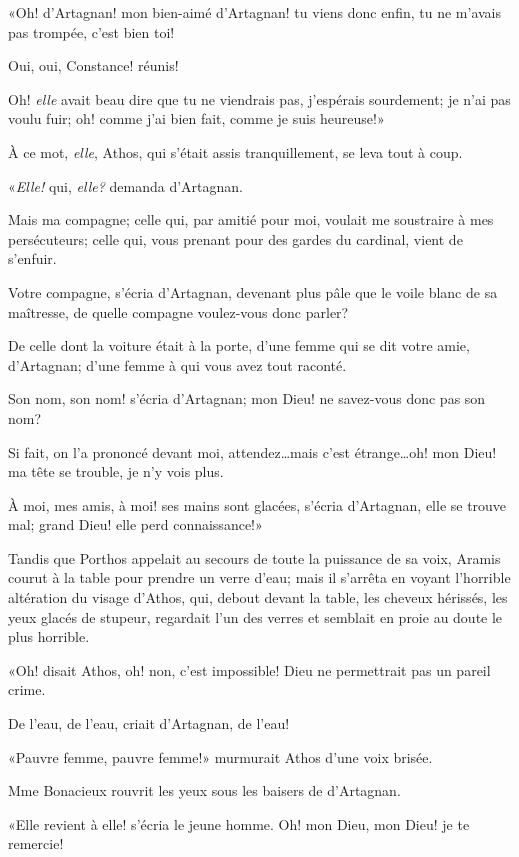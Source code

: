 «Oh! d'Artagnan! mon bien-aimé d'Artagnan! tu viens donc enfin, tu ne m'avais pas trompée, c'est bien toi! 

\speak  Oui, oui, Constance! réunis! 

\speak  Oh! \textit{elle} avait beau dire que tu ne viendrais pas, j'espérais sourdement; je n'ai pas voulu fuir; oh! comme j'ai bien fait, comme je suis heureuse!» 

À ce mot, \textit{elle}, Athos, qui s'était assis tranquillement, se leva tout à coup. 

«\textit{Elle!} qui, \textit{elle?} demanda d'Artagnan. 

\speak  Mais ma compagne; celle qui, par amitié pour moi, voulait me soustraire à mes persécuteurs; celle qui, vous prenant pour des gardes du cardinal, vient de s'enfuir. 

\speak  Votre compagne, s'écria d'Artagnan, devenant plus pâle que le voile blanc de sa maîtresse, de quelle compagne voulez-vous donc parler? 

\speak  De celle dont la voiture était à la porte, d'une femme qui se dit votre amie, d'Artagnan; d'une femme à qui vous avez tout raconté. 

\speak  Son nom, son nom! s'écria d'Artagnan; mon Dieu! ne savez-vous donc pas son nom? 

\speak  Si fait, on l'a prononcé devant moi, attendez\dots mais c'est étrange\dots oh! mon Dieu! ma tête se trouble, je n'y vois plus. 

\speak  À moi, mes amis, à moi! ses mains sont glacées, s'écria d'Artagnan, elle se trouve mal; grand Dieu! elle perd connaissance!» 

Tandis que Porthos appelait au secours de toute la puissance de sa voix, Aramis courut à la table pour prendre un verre d'eau; mais il s'arrêta en voyant l'horrible altération du visage d'Athos, qui, debout devant la table, les cheveux hérissés, les yeux glacés de stupeur, regardait l'un des verres et semblait en proie au doute le plus horrible. 

«Oh! disait Athos, oh! non, c'est impossible! Dieu ne permettrait pas un pareil crime. 

\speak  De l'eau, de l'eau, criait d'Artagnan, de l'eau! 

«Pauvre femme, pauvre femme!» murmurait Athos d'une voix brisée. 

Mme Bonacieux rouvrit les yeux sous les baisers de d'Artagnan. 

«Elle revient à elle! s'écria le jeune homme. Oh! mon Dieu, mon Dieu! je te remercie! 

